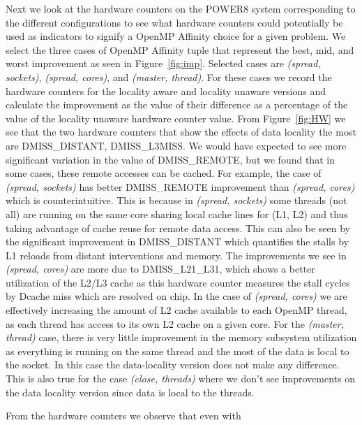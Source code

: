 %
Next we look at the hardware counters on the POWER8 system corresponding to the different configurations to see what hardware counters could potentially be used as indicators to signify a OpenMP Affinity choice for a given problem. 
We select the three cases of OpenMP Affinity tuple that represent the best, mid, and worst improvement as seen in Figure~\ref{fig:imp}. 
Selected cases are \textit{(spread, sockets)},  \textit{(spread, cores)}, and \textit{(master, thread)}. 
For these cases we record the hardware counters for the locality aware and locality unaware versions and calculate the improvement as the value of their difference as a percentage of the value of the locality unaware hardware counter value. 
From Figure~\ref{fig:HW} we see that the two hardware counters that show the effects of data locality the most are DMISS\_DISTANT, DMISS\_L3MISS.
We would have expected to see more significant variation in the value of DMISS\_REMOTE, but we found that in some cases, these remote accesses can be cached.
For example, the case of \textit{(spread, sockets)} has better DMISS\_REMOTE improvement than  \textit{(spread, cores)} which is counterintuitive. 
This is because in \textit{(spread, sockets)} some threads (not all) are running on the same core sharing local cache lines for (L1, L2) and thus taking advantage of cache reuse for remote data access. 
This can also be seen by the significant improvement in DMISS\_DISTANT which quantifies the stalls by L1 reloads from distant interventions and memory. 
The improvements we see in \textit{(spread, cores)} are more due to DMISS\_L21\_L31, which shows a better utilization of the L2/L3 cache as this hardware counter measures the stall cycles by Dcache miss which are resolved on chip. 
In the case of  \textit{(spread, cores)} we are effectively increasing the amount of 
L2 cache available to each OpenMP thread, as each thread has access to its own L2 cache on a given core. 
For the \textit{(master, thread)} case, there is very little improvement in the memory subsystem utilization as everything is running on the same thread and the most of the data is local to the socket. In this case the data-locality version does not make any difference. This is also true for the case  \textit{(close, threads)} where
 we don't see improvements on the data locality version since data is local to the threads.

From the hardware counters we observe that even with 


